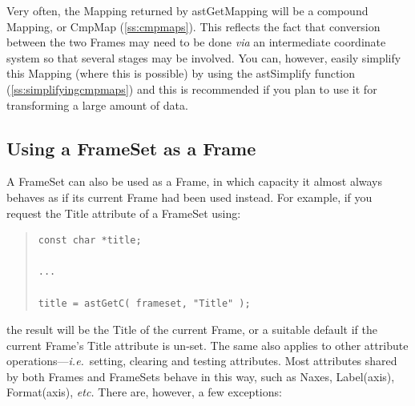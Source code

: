 \documentclass[twoside,11pt]{article}
\newcommand{\htmlref}[2]{#1}
\newcommand{\secref}[1]{\S\ref{#1}}
\renewcommand{\secref}[1]{\ref{#1}}
\begin{document}
Very often, the Mapping returned by astGetMapping will be a compound
Mapping, or \htmlref{CmpMap}{CmpMap} (\secref{ss:cmpmaps}). This reflects the fact that
conversion between the two Frames may need to be done {\em{via}} an
intermediate coordinate system so that several stages may be involved.
You can, however, easily simplify this Mapping (where this is possible)
by using the \htmlref{astSimplify}{astSimplify} function (\secref{ss:simplifyingcmpmaps}) and
this is recommended if you plan to use it for transforming a large
amount of data.

\subsection{\label{ss:framesetasframe}Using a FrameSet as a Frame}

A \htmlref{FrameSet}{FrameSet} can also be used as a \htmlref{Frame}{Frame}, in which capacity it almost
always behaves as if its current Frame had been used instead. For
example, if you request the \htmlref{Title}{Title} attribute of a FrameSet using:

\begin{quote}
\small
\begin{verbatim}
const char *title;

...

title = astGetC( frameset, "Title" );
\end{verbatim}
\normalsize
\end{quote}

the result will be the Title of the current Frame, or a suitable
default if the current Frame's Title attribute is un-set. The same
also applies to other attribute operations---{\em{i.e.}}\ setting,
clearing and testing attributes.  Most attributes shared by both
Frames and FrameSets behave in this way, such as \htmlref{Naxes}{Naxes}, \htmlref{Label(axis)}{Labelaxis},
\htmlref{Format(axis)}{Formataxis}, {\em{etc.}} There are, however, a few exceptions:
\end{document}
